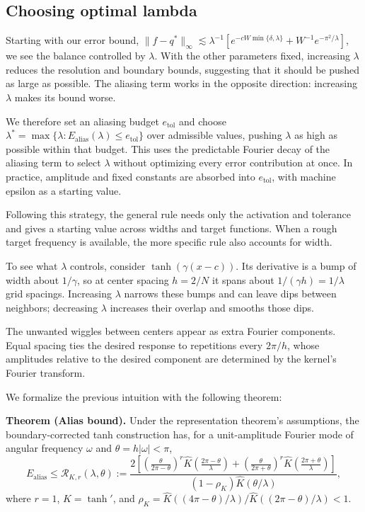 \subsection{Choosing optimal lambda}\label{sec:choosing-lambda}

Starting with our error bound, \(\|f-q^*\|_\infty\lesssim\lambda^{-1}[e^{-cW\min\{\delta,\lambda\}}+W^{-1}e^{-\pi^2/\lambda}]\), we see the balance controlled by \(\lambda\). With the other parameters fixed, increasing \(\lambda\) reduces the resolution and boundary bounds, suggesting that it should be pushed as large as possible. The aliasing term works in the opposite direction: increasing \(\lambda\) makes its bound worse.

We therefore set an aliasing budget \(e_{\mathrm{tol}}\) and choose \(\lambda^*=\max\{\lambda:E_{\mathrm{alias}}(\lambda)\le e_{\mathrm{tol}}\}\) over admissible values, pushing \(\lambda\) as high as possible within that budget. This uses the predictable Fourier decay of the aliasing term to select \(\lambda\) without optimizing every error contribution at once. In practice, amplitude and fixed constants are absorbed into \(e_{\mathrm{tol}}\), with machine epsilon as a starting value.

Following this strategy, the general rule needs only the activation and tolerance and gives a starting value across widths and target functions. When a rough target frequency is available, the more specific rule also accounts for width.

To see what \(\lambda\) controls, consider \(\tanh(\gamma(x-c))\). Its derivative is a bump of width about \(1/\gamma\), so at center spacing \(h=2/N\) it spans about \(1/(\gamma h)=1/\lambda\) grid spacings. Increasing \(\lambda\) narrows these bumps and can leave dips between neighbors; decreasing \(\lambda\) increases their overlap and smooths those dips.

The unwanted wiggles between centers appear as extra Fourier components. Equal spacing ties the desired response to repetitions every \(2\pi/h\), whose amplitudes relative to the desired component are determined by the kernel's Fourier transform.

We formalize the previous intuition with the following theorem:

\noindent\textbf{Theorem (Alias bound).}
Under the representation theorem's assumptions, the boundary-corrected tanh construction has, for a unit-amplitude Fourier mode of angular frequency \(\omega\) and \(\theta=h|\omega|<\pi\),
\begin{equation}
E_{\mathrm{alias}}\le \mathcal R_{K,r}(\lambda,\theta):=
\frac{2\left[
\left(\frac{\theta}{2\pi-\theta}\right)^r \widehat K\!\left(\frac{2\pi-\theta}{\lambda}\right)
+\left(\frac{\theta}{2\pi+\theta}\right)^r \widehat K\!\left(\frac{2\pi+\theta}{\lambda}\right)
\right]}{(1-\rho_K)\widehat K(\theta/\lambda)},
\label{eq:compact-replica}
\end{equation}
where \(r=1\), \(K=\tanh'\), and \(\rho_K=\widehat K((4\pi-\theta)/\lambda)/\widehat K((2\pi-\theta)/\lambda)<1\).

